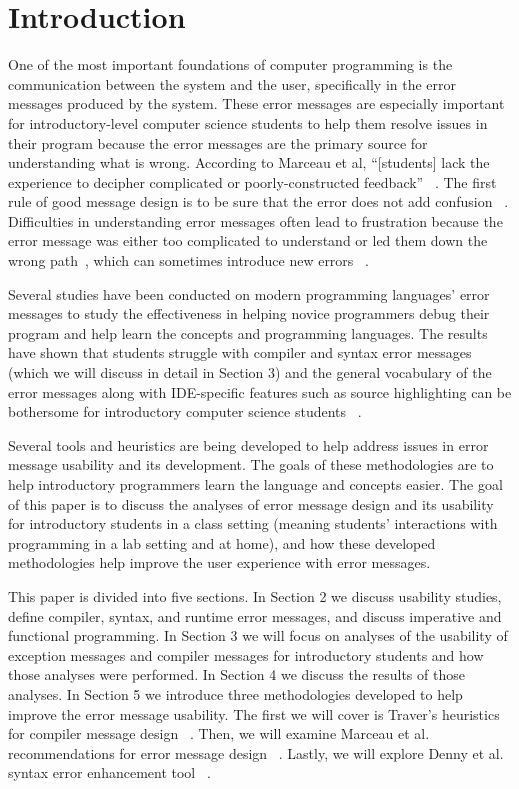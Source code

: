 \documentclass{sig-alternate}
\begin{document}
\section{Introduction}\label{sec:intro}
One of the most important foundations of computer programming is the communication between the system and the user, specifically in the error messages produced by the system.
These error messages are especially important for introductory-level computer science students to help them resolve issues in their program because the error messages are the primary source for understanding what is wrong.
According to Marceau et al, ``[students] lack the experience to decipher complicated or poorly-constructed feedback'' ~\cite{Marceau:2011:MEE:1953163.1953308}.
The first rule of good message design is to be sure that the error does not add confusion ~\cite{Isa:1983:MOE:800045.801583}.
Difficulties in understanding error messages often lead to frustration because the error message was either too complicated to understand or led them down the wrong path~\cite{Marceau:2011:MYL:2048237.2048241}, which can sometimes introduce new errors ~\cite{Denny:2014:ESE:2591708.2591748}. 

Several studies have been conducted on modern programming languages' error messages to study the effectiveness in helping novice programmers debug their program and help learn the concepts and programming languages.
The results have shown that students struggle with compiler and syntax error messages ~\cite{Denny:2014:ESE:2591708.2591748,Traver:2010} (which we will discuss in detail in Section 3) and the general vocabulary of the error messages along with IDE-specific features such as source highlighting can be bothersome for introductory computer science students ~\cite{Marceau:2011:MYL:2048237.2048241}. 

Several tools and heuristics are being developed to help address issues in error message usability and its development.
The goals of these methodologies are to help introductory programmers learn the language and concepts easier.
The goal of this paper is to discuss the analyses of error message design and its usability for introductory students in a class setting (meaning students' interactions with programming in a lab setting and at home), and how these developed methodologies help improve the user experience with error messages. 

This paper is divided into five sections.
In Section 2 we discuss usability studies, define compiler, syntax, and runtime error messages, and discuss imperative and functional programming.
In Section 3 we will focus on  analyses of the usability of exception messages and compiler messages for introductory students and how those analyses were performed.
In Section 4 we discuss the results of those analyses.
In Section 5 we introduce three methodologies developed to help improve the error message usability.
The first we will cover is Traver's heuristics for compiler message design ~\cite{Traver:2010}.
Then, we will examine Marceau et al. recommendations for error message design ~\cite{Marceau:2011:MYL:2048237.2048241}.
Lastly, we will explore Denny et al. syntax error enhancement tool ~\cite{Denny:2014:ESE:2591708.2591748}.
\end{document}
